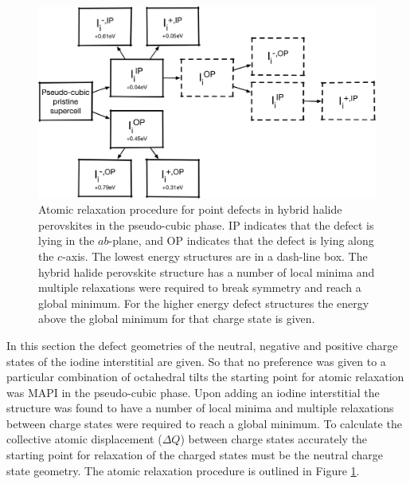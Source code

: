\begin{figure}[h!]
\centering
  \includegraphics[width=0.7\columnwidth]{figures/ch6/relaxation_workflow.png}
  \caption[Atomic relaxation procedure for point defects in hybrid halide perovskites]{Atomic relaxation procedure for point defects in hybrid halide perovskites in the pseudo-cubic phase. IP indicates that the defect is lying in the $ab$-plane, and OP indicates that the defect is lying along the $c$-axis. The lowest energy structures are in a dash-line box. The hybrid halide perovskite structure has a number of local minima and multiple relaxations were required to break symmetry and reach a global minimum. For the higher energy defect structures the energy above the global minimum for that charge state is given.}
\label{relaxation_workflow}
\end{figure}

In this section the defect geometries of the neutral, negative and positive charge states of the iodine interstitial are given. So that no preference was given to a particular combination of octahedral tilts the starting point for atomic relaxation was MAPI in the pseudo-cubic phase. Upon adding an iodine interstitial the structure was found to have a number of local minima and multiple relaxations between charge states were required to reach a global minimum. To calculate the collective atomic displacement ($\Delta Q$) between charge states accurately the starting point for relaxation of the charged states must be the neutral charge state geometry. The atomic relaxation procedure is outlined in Figure \ref{relaxation_workflow}.

